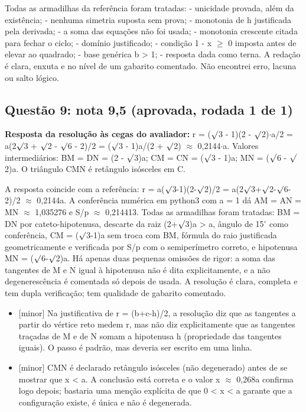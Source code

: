 \documentclass{article}%
\begin{document}
Todas as armadilhas da referência foram tratadas:\newline%
{-} unicidade provada, além da existência;\newline%
{-} nenhuma simetria suposta sem prova;\newline%
{-} monotonia de h justificada pela derivada;\newline%
{-} a soma das equações não foi usada;\newline%
{-} monotonia crescente citada para fechar o ciclo;\newline%
{-} domínio justificado;\newline%
{-} condição 1 - x $\geq$ 0 imposta antes de elevar ao quadrado;\newline%
{-} base genérica b > 1;\newline%
{-} resposta dada como terna.\newline%
\newline%
A redação é clara, enxuta e no nível de um gabarito comentado. Não encontrei erro, lacuna ou salto lógico.%
\subsection*{Questão 9: nota 9,5 (aprovada, rodada 1 de 1)}%
\textbf{Resposta da resolução às cegas do avaliador:} r = ($\surd$3 - 1)(2 - $\surd$2)$\cdot$a/2 = a(2$\surd$3 + $\surd$2 - $\surd$6 - 2)/2 = ($\surd$3 - 1)a/(2 + $\surd$2) $\approx$ 0,2144$\cdot$a.\newline%
Valores intermediários: BM = DN = (2 - $\surd$3)a; CM = CN = ($\surd$3 - 1)a; MN = ($\surd$6 - $\surd$2)a. O triângulo CMN é retângulo isósceles em C.\par %
A resposta coincide com a referência: r = a($\surd$3-1)(2-$\surd$2)/2 = a(2$\surd$3+$\surd$2-$\surd$6-2)/2 $\approx$ 0,2144a. A conferência numérica em python3 com a = 1 dá AM = AN = MN $\approx$ 1,035276 e S/p $\approx$ 0,214413. Todas as armadilhas foram tratadas: BM = DN por cateto{-}hipotenusa, descarte da raiz (2+$\surd$3)a > a, ângulo de 15$^\circ$ como conferência, CM = ($\surd$3-1)a sem troca com BM, fórmula do raio justificada geometricamente e verificada por S/p com o semiperímetro correto, e hipotenusa MN = ($\surd$6-$\surd$2)a. Há apenas duas pequenas omissões de rigor: a soma das tangentes de M e N igual à hipotenusa não é dita explicitamente, e a não degenerescência é comentada só depois de usada. A resolução é clara, completa e tem dupla verificação; tem qualidade de gabarito comentado.%
\begin{itemize}%
\item%
{[}minor{]} Na justificativa de r = (b+c-h)/2, a resolução diz que as tangentes a partir do vértice reto medem r, mas não diz explicitamente que as tangentes traçadas de M e de N somam a hipotenusa h (propriedade das tangentes iguais). O passo é padrão, mas deveria ser escrito em uma linha.%
\item%
{[}minor{]} CMN é declarado retângulo isósceles (não degenerado) antes de se mostrar que x < a. A conclusão está correta e o valor x $\approx$ 0,268a confirma logo depois; bastaria uma menção explícita de que 0 < x < a garante que a configuração existe, é única e não é degenerada.%
\end{itemize}%
\end{document}
